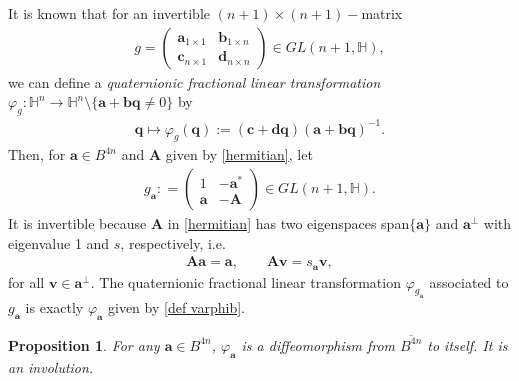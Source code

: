 \documentclass[a4paper,11pt]{amsart}
\numberwithin{equation}{section}
\newtheorem{prop}{Proposition}[section]
\begin{document}
It is known \cite[(1.4)]{wang4} that for an invertible $(n+1)\times (n+1)-$matrix
\begin{equation}\begin{aligned}
g=\begin{pmatrix} \mathbf{a}_{1\times 1} & \mathbf{b}_{1\times n} \\ \mathbf{c}_{n\times 1} & \mathbf{d}_{n\times n} \end{pmatrix}\in GL(n+1,\mathbb{H}),
\end{aligned}\end{equation}
we can define a {\it quaternionic fractional linear transformation} $\varphi_{g}:\mathbb{H}^n \rightarrow \mathbb{H}^n\setminus \{\mathbf{a}+\mathbf{b}\mathbf{q}\neq 0\}$ by
\begin{equation}\begin{aligned}\label{def m g}
\mathbf{q}\mapsto \varphi_{g}(\mathbf{q}):=(\mathbf{c}+\mathbf{d}\mathbf{q})(\mathbf{a}+\mathbf{b}\mathbf{q})^{-1}.
\end{aligned}\end{equation}
Then, for $\mathbf{a}\in B^{4n}$ and $\mathbf{A}$ given by \eqref{hermitian}, let
\begin{equation}\begin{aligned}\label{def g b}
g_{\mathbf{a}}: =\begin{pmatrix} 1 & -\mathbf{a}^* \\ \mathbf{a} & -\mathbf{A} \end{pmatrix}\in GL(n+1,\mathbb{H}).
\end{aligned}\end{equation}
It is invertible because $\mathbf{A}$ in \eqref{hermitian} has two eigenspaces span$\{\mathbf{a}\}$ and $\mathbf{a}^{\bot}$ with eigenvalue 1 and $s$, respectively,
i.e.
\begin{equation}\begin{aligned}\label{eigen}
\mathbf{A}\mathbf{a}=\mathbf{a},\qquad\mathbf{A}\mathbf{v}=s_{\mathbf{a}}\mathbf{v},
\end{aligned}\end{equation}
for all $\mathbf{v}\in \mathbf{a}^{\bot}$. The quaternionic fractional linear transformation $\varphi_{g_{\mathbf{a}}}$ associated to $g_{\mathbf{a}}$ is exactly $\varphi_{\mathbf{a}}$ given by \eqref{def varphib}.




\begin{prop}
For any $\mathbf{a}\in B^{4n}$, $\varphi_{\mathbf{a}}$ is a diffeomorphism from $\overline{B^{4n}}$ to itself. It is an involution.

\end{prop}
\end{document}
